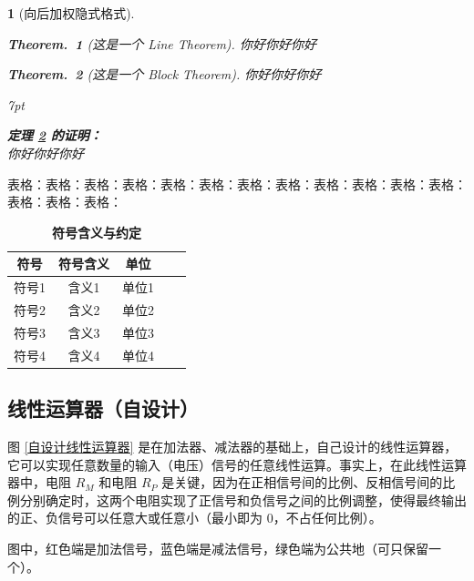 \documentclass[a4paper]{article}  %
\newenvironment{graybox}{%
    \def\FrameCommand{%
    \hspace{1pt}%
    {\color{gray}\small \vrule width 2pt}%
    {\color{graybox_color}\vrule width 4pt}%
    \colorbox{graybox_color}%
    }%
    \MakeFramed{\advance\hsize-\width\FrameRestore}%
    \noindent\hspace{-4.55pt}%
    \begin{adjustwidth}{}{7pt}%
    \vspace{2pt}\vspace{2pt}%
    }
    {%
    \vspace{2pt}\end{adjustwidth}\endMakeFramed%
    }
\theoremstyle{MyLineTheoremStyle} %
\newtheorem{LineTheorem}{Theorem.\,}
\theoremstyle{MyBlockTheoremStyle} %
\newtheorem{BlockTheorem}[LineTheorem]{Theorem.\,} %
\theoremstyle{MySubsubsectionStyle} %
\newtheorem{definition}{}
\renewcommand{\small}{\fontsize{5pt}{3.5pt}\selectfont}
\begin{document}
\begin{multicols*}{4}
\begin{definition}[向后加权隐式格式]
\begin{LineTheorem}[这是一个 Line Theorem]\label{这是一个 Line Theorem}
    你好你好你好
\end{LineTheorem}

\begin{BlockTheorem}[这是一个 Block Theorem]\label{这是一个 Block Theorem}
    你好你好你好
\end{BlockTheorem}



\begin{graybox}
\textbf{定理 \ref{这是一个 Block Theorem} 的证明：}\\
你好你好你好
\end{graybox}


\end{definition}

表格：表格：表格：表格：表格：表格：表格：表格：表格：表格：表格：表格：表格：表格：表格：

\begin{table}[H]
    \centering
    \caption{\textbf{符号含义与约定}}
    \label{tab:waterpump}
    \begin{tabular}{ccccc}
    \toprule
    符号 & 符号含义& 单位\\
    \midrule
    符号1& 含义1& 单位1\\
    符号2& 含义2& 单位2\\
    符号3& 含义3& 单位3\\
    符号4& 含义4& 单位4\\
    \bottomrule
    \end{tabular}
\end{table}

\subsection{线性运算器（自设计）}
图 \ref{自设计线性运算器} 是在加法器、减法器的基础上，自己设计的线性运算器，它可以实现任意数量的输入（电压）信号的任意线性运算。事实上，在此线性运算器中，电阻 $R_M$ 和电阻 $R_P$ 是关键，因为在正相信号间的比例、反相信号间的比例分别确定时，这两个电阻实现了正信号和负信号之间的比例调整，使得最终输出的正、负信号可以任意大或任意小（最小即为 0，不占任何比例）。

图中，红色端是加法信号，蓝色端是减法信号，绿色端为公共地（可只保留一个）。

\setlength{\floatsep}{12pt plus 2pt minus 2pt} %
\setlength{\textfloatsep}{18pt plus 2pt minus 4pt} %
\setlength{\intextsep}{12pt plus 2pt minus 2pt} %


\end{multicols*}
\end{document}
